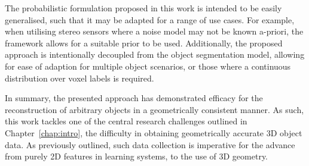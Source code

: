 The probabilistic formulation proposed in this work is intended to be easily generalised, such that 
it may be adapted for a range of use cases. For example, when utilising stereo sensors where a noise 
model may not be known a-priori, the framework allows for a suitable prior to be used. Additionally, 
the proposed approach is intentionally decoupled from the object segmentation model, allowing for 
ease of adaption for multiple object scenarios, or those where a continuous distribution over voxel 
labels is required.

In summary, the presented approach has demonstrated efficacy for the reconstruction of arbitrary 
objects in a geometrically consistent manner. As such, this work tackles one of the central research 
challenges outlined in Chapter~\ref{chap:intro}, the difficulty in obtaining geometrically accurate 
3D object data. As previously outlined, such data collection is imperative for the advance from purely 
2D features in learning systems, to the use of 3D geometry.